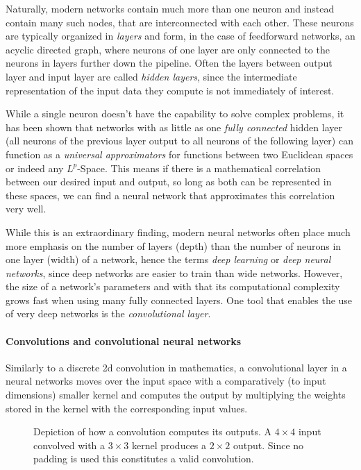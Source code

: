 Naturally, modern networks contain much more than one neuron and instead contain many such nodes, that are interconnected with each other. 
These neurons are typically organized in \emph{layers} and form, in the case of feedforward networks, an acyclic directed graph, where neurons of one layer are only connected to the neurons in layers further down the pipeline. Often the layers between output layer and input layer are called \emph{hidden layers}, since the intermediate representation of the input data they compute is not immediately of interest.

While a single neuron doesn't have the capability to solve complex problems, it has been shown that networks with as little as one \emph{fully connected} hidden layer (all neurons of the previous layer output to all neurons of the following layer) can function as a \emph{universal approximators} for functions between two Euclidean spaces\cite{hornikMultilayerFeedforwardNetworks1989} or indeed any $L^p$-Space\cite{parkMinimumWidthUniversal2020}. This means if there is a mathematical correlation between our desired input and output, so long as both can be represented in these spaces, we can find a neural network that approximates this correlation very well.

While this is an extraordinary finding, modern neural networks often place much more emphasis on the number of layers (depth) than the number of neurons in one layer (width) of a network, hence the terms \emph{deep learning} or \emph{deep neural networks}, since deep networks are easier to train than wide networks. However, the size of a network's parameters and with that its computational complexity grows fast when using many fully connected layers. One tool that enables the use of very deep networks is the \emph{convolutional layer}.

\paragraph*{Convolutions and convolutional neural networks}

Similarly to a discrete 2d convolution in mathematics, a convolutional layer in a neural networks moves over the input space with a comparatively (to input dimensions) smaller kernel and computes the output by multiplying the weights stored in the kernel with the corresponding input values.

\begin{figure}[htbp]
    \caption{Depiction of how a convolution computes its outputs. A $4\times 4$ input convolved with a $3\times 3$ kernel produces a $2\times 2$ output. Since no padding is used this constitutes a valid convolution. \cite{Att00028Png}}
    \label{fig:convolution}
\end{figure}

